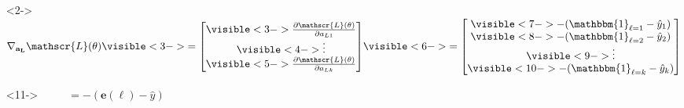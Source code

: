 \begin{frame}
\begin{columns}
\begin{overlayarea}{\textwidth}{\textheight}
      \vspace{0.42cm}
      \begin{itemize}
        \justifying
        \item[]<2-> $\mathbf{\nabla_{a_{L}}} \mathscr{L}(\theta) \visible<3->{ =
                \begin{bmatrix}
                  \visible<3->{\frac{\partial \mathscr{L}(\theta)}{\partial a_{L1}}}   \\
                  \visible<4->{\vdots}                                              \\
                  \visible<5->{\frac{\partial \mathscr{L}(\theta)}{\partial a_{Lk}}} \\
                \end{bmatrix} }
              \visible<6->{ = \begin{bmatrix}
                  \visible<7->{ - (\mathbbm{1}_{\ell = 1} - \hat{y}_1)}       \\
                  \visible<8->{- (\mathbbm{1}_{\ell = 2} - \hat{y}_2)}        \\
                  \visible<9->{\vdots}                                     \\
                  \visible<10->{- (\mathbbm{1}_{\ell = k} - \hat{y}_{k})} \\
                \end{bmatrix} }$
        \item[]<11-> $\hspace{1cm}= - (\mathbf{e}(\ell) - \hat{y})$
      \end{itemize}
    \end{overlayarea}
    \begin{overlayarea}{\textwidth}{\textheight}
      \makebox[\textwidth][c]{\usebox{\nnoutputtwocontent}}
    \end{overlayarea}
  \end{columns}
\end{frame}
